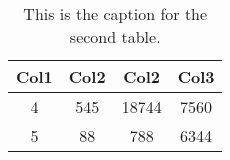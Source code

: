 \begin{mdframed}[style=MyFrame1]
    \begin{defn}
        \label{defn:}
    \end{defn}
    \cusTi{}
    \cusTe{}
    \begin{equation*}
        
    \end{equation*}
\end{mdframed}


\begin{mdframed}[style=MyFrame1]
    \begin{prop}
        \label{prop:}
    \end{prop}
    \cusTi{}
    \begin{equation*}
        
    \end{equation*}
\end{mdframed}


\begin{mdframed}[style=MyFrame2]
    \begin{example}
        \label{eg:}
    \end{example}
    \cusTi{}
    \begin{formatI}
        
    \end{formatI}
\end{mdframed}


\begin{table}[h!]
    \centering
    \begin{tabular}{||c c c c||} 
        \hline
        Col1 & Col2 & Col2 & Col3 \\ [0.5ex] 
        \hline\hline
        4 & 545 & 18744 & 7560 \\
        5 & 88 & 788 & 6344 \\ [1ex] 
        \hline
    \end{tabular}
    \caption{This is the caption for the second table.}
    \label{table:2}
\end{table}